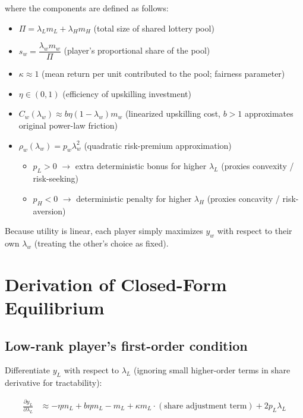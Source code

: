 \documentclass[11pt]{article}
\begin{document}
where the components are defined as follows:

\begin{itemize}[leftmargin=*]
    \item $\Pi = \lambda_L m_L + \lambda_H m_H$ \quad (total size of shared lottery pool)
    \item $s_w = \dfrac{\lambda_w m_w}{\Pi}$ \quad (player's proportional share of the pool)
    \item $\kappa \approx 1$ \quad (mean return per unit contributed to the pool; fairness parameter)
    \item $\eta \in (0,1)$ \quad (efficiency of upskilling investment)
    \item $C_w(\lambda_w) \approx b \eta (1 - \lambda_w) m_w$ \quad (linearized upskilling cost, $b > 1$ approximates original power-law friction)
    \item $\rho_w(\lambda_w) = p_w \lambda_w^2$ \quad (quadratic risk-premium approximation)
          \begin{itemize}
              \item $p_L > 0$ \quad $\to$ extra deterministic bonus for higher $\lambda_L$ (proxies convexity / risk-seeking)
              \item $p_H < 0$ \quad $\to$ deterministic penalty for higher $\lambda_H$ (proxies concavity / risk-aversion)
          \end{itemize}
\end{itemize}

Because utility is linear, each player simply maximizes $y_w$ with respect to their own $\lambda_w$ (treating the other's choice as fixed).

\section{Derivation of Closed-Form Equilibrium}

\subsection{Low-rank player's first-order condition}

Differentiate $y_L$ with respect to $\lambda_L$ (ignoring small higher-order terms in share derivative for tractability):

\begin{align*}
\frac{\partial y_L}{\partial \lambda_L} 
&\approx -\eta m_L + b \eta m_L - m_L + \kappa m_L \cdot (\text{share adjustment term}) 
  + 2 p_L \lambda_L
\end{align*}
\end{document}
